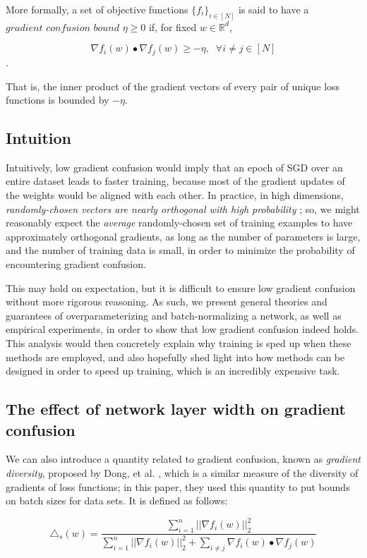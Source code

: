 \documentclass{article}
\begin{document}
More formally, a set of objective functions $\{f_i\}_{i \in [N]}$ is said to have a $\textit{gradient confusion bound}$ $\eta \geq 0$ if, for fixed $w \in \mathbb{R}^d$,

$$ \nabla f_i(w) \bullet \nabla f_j(w) \geq -\eta, \;\; \forall i \not = j \in [N]$$.

That is, the inner product of the gradient vectors of every pair of unique loss functions is bounded by $-\eta$.

\subsection{Intuition}
Intuitively, low gradient confusion would imply that an epoch of SGD over an entire dataset leads to faster training, because most of the gradient updates of the weights would be aligned with each other. In practice, in high dimensions, \textit{randomly-chosen vectors are nearly orthogonal with high probability} \cite{Milman}; so, we might reasonably expect the \textit{average} randomly-chosen set of training examples to have approximately orthogonal gradients, as long as the number of parameters is large, and the number of training data is small, in order to minimize the probability of encountering gradient confusion. 

This may hold on expectation, but it is difficult to ensure low gradient confusion without more rigorous reasoning. As such, we present general theories and guarantees of overparameterizing and batch-normalizing a network, as well as empirical experiments, in order to show that low gradient confusion indeed holds. This analysis would then concretely explain why training is sped up when these methods are employed, and also hopefully shed light into how methods can be designed in order to speed up training, which is an incredibly expensive task.

\subsection{The effect of network layer width on gradient confusion}
We can also introduce a quantity related to gradient confusion, known as \textit{gradient diversity}, proposed by Dong, et al. \cite{dong}, which is a similar measure of the diversity of gradients of loss functions; in this paper, they used this quantity to put bounds on batch sizes for data sets. It is defined as follows:

$$\triangle_s(w) = \frac{\sum_{i=1}^n || \nabla f_i(w) ||_2^2}{\sum_{i=1}^n || \nabla f_i(w)||_2^2 + \sum_{i \not = j} \nabla f_i(w) \bullet \nabla f_j(w) }$$
\end{document}
